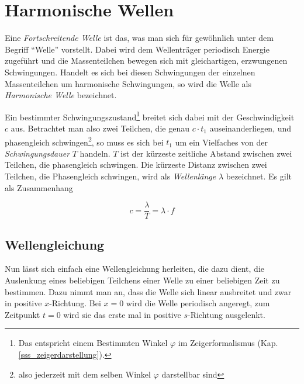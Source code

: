		\chapter{Harmonische Wellen}

Eine \emph{Fortschreitende Welle} ist das, was man sich für gewöhnlich unter dem Begriff ``Welle'' vorstellt. Dabei wird dem Wellenträger periodisch Energie zugeführt und die Massenteilchen bewegen sich mit gleichartigen, erzwungenen Schwingungen. Handelt es sich bei diesen Schwingungen der einzelnen Massenteilchen um harmonische Schwingungen, so wird die Welle als \emph{Harmonische Welle} bezeichnet.

Ein bestimmter Schwingungszustand\footnote{Das entspricht einem Bestimmten Winkel \(\varphi\) im Zeigerformalismus (Kap. \ref{sss_zeigerdarstellung}).} breitet sich dabei mit der Geschwindigkeit \(c\) aus. Betrachtet man also zwei Teilchen, die genau \(c \cdot t_1\) auseinanderliegen, und phasengleich schwingen\footnote{also jederzeit mit dem selben Winkel \(\varphi\) darstellbar sind}, so muss es sich bei \(t_1\) um ein Vielfaches von der \emph{Schwingungsdauer} \(T\) handeln. \(T\) ist der kürzeste zeitliche Abstand zwischen zwei Teilchen, die phasengleich schwingen. Die kürzeste Distanz zwischen zwei Teilchen, die Phasengleich schwingen, wird als \emph{Wellenlänge} \(\lambda\) bezeichnet. Es gilt als Zusammenhang

\begin{equation}
 	c = \frac{\lambda}{T} = \lambda \cdot f
 	\label{eq_cLf}
\end{equation}


			\section{Wellengleichung}

Nun lässt sich einfach eine Wellengleichung herleiten, die dazu dient, die Auslenkung eines beliebigen Teilchens einer Welle zu einer beliebigen Zeit zu bestimmen. Dazu nimmt man an, dass die Welle sich linear ausbreitet und zwar in positive \(x\)-Richtung. Bei \(x =0\) wird die Welle periodisch angeregt, zum Zeitpunkt \(t = 0\) wird sie das erste mal in positive \(s\)-Richtung ausgelenkt.

